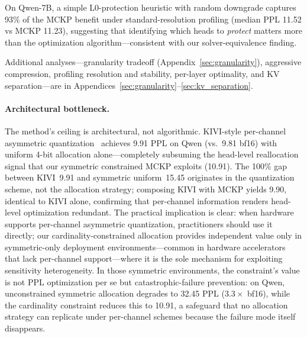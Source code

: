On Qwen-7B, a simple L0-protection heuristic with random downgrade captures 93\% of the MCKP benefit under standard-resolution profiling (median PPL 11.52 vs MCKP 11.23), suggesting that identifying which heads to \emph{protect} matters more than the optimization algorithm---consistent with our solver-equivalence finding.

Additional analyses---granularity tradeoff (Appendix~\ref{sec:granularity}), aggressive compression, profiling resolution and stability, per-layer optimality, and KV separation---are in Appendices~\ref{sec:granularity}--\ref{sec:kv_separation}.

\paragraph{Architectural bottleneck.}
The method's ceiling is architectural, not algorithmic.
KIVI-style per-channel asymmetric quantization~\cite{liu2024kivi} achieves 9.91 PPL on Qwen (vs.\ 9.81 bf16) with uniform 4-bit allocation alone---completely subsuming the head-level reallocation signal that our symmetric constrained MCKP exploits (10.91).
The 100\% gap between KIVI~9.91 and symmetric uniform~15.45 originates in the quantization scheme, not the allocation strategy; composing KIVI with MCKP yields 9.90, identical to KIVI alone, confirming that per-channel information renders head-level optimization redundant.
The practical implication is clear: when hardware supports per-channel asymmetric quantization, practitioners should use it directly; our cardinality-constrained allocation provides independent value only in symmetric-only deployment environments---common in hardware accelerators that lack per-channel support---where it is the sole mechanism for exploiting sensitivity heterogeneity.
In those symmetric environments, the constraint's value is not PPL optimization per se but catastrophic-failure prevention: on Qwen, unconstrained symmetric allocation degrades to 32.45 PPL ($3.3\times$ bf16), while the cardinality constraint reduces this to 10.91, a safeguard that no allocation strategy can replicate under per-channel schemes because the failure mode itself disappears.
